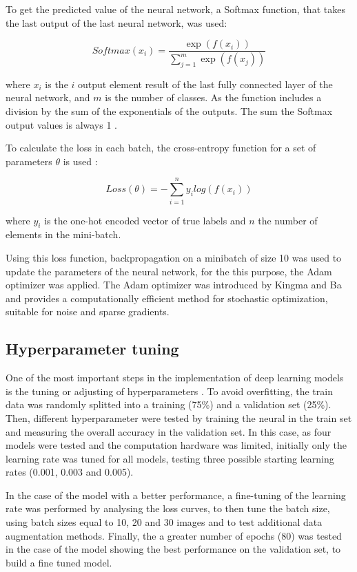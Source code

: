 \documentclass[10pt,onecolumn,titlepage,letterpaper]{article}
\begin{document}
To get the predicted value of the neural network, a Softmax function, that takes the last output of the last neural network, was used:

\begin{equation}
	{Softmax}(x_{i}) = \frac{\exp(f(x_i))}{\sum_{j=1}^{m} \exp(f(x_j))}
\end{equation}

where $x_i$ is the $i$ output element result of the last fully connected layer of the neural network, and $m$ is the number of classes. As the function includes a division by the sum of the exponentials of the outputs. The sum the Softmax output values is always 1 \cite{Skansi2018}.

To calculate the loss in each batch, the cross-entropy function for a set of parameters $\theta$ is used \cite{Skansi2018}:

\begin{equation}
	{Loss}(\theta) = - \sum_{i=1}^{n} y_i log(f(x_i))
\end{equation}

where $y_i$ is the one-hot encoded vector of true labels and $n$ the number of elements in the mini-batch. 

Using this loss function, backpropagation on a minibatch of size 10 was used to update the parameters of the neural network, for the this purpose, the Adam optimizer was applied. The Adam optimizer was introduced by Kingma and Ba \cite{Kingma2015} and provides a computationally efficient method for stochastic optimization, suitable for noise and sparse gradients.

\subsection{Hyperparameter tuning}

One of the most important steps in the implementation of deep learning models is the tuning or adjusting of hyperparameters \cite{Skansi2018}. To avoid overfitting, the train data was randomly splitted into a training (75\%) and a validation set (25\%). Then, different hyperparameter were tested by training the neural in the train set and measuring the overall accuracy in the validation set. In this case, as four models were tested and the computation hardware was limited, initially only the learning rate was tuned for all models, testing three possible starting learning rates (0.001, 0.003 and 0.005). 

In the case of the model with a better performance, a fine-tuning of the learning rate was performed by analysing the loss curves, to then tune the batch size, using batch sizes equal to 10, 20 and 30 images and to test additional data augmentation methods. Finally, the a greater number of epochs (80) was tested in the case of the model showing the best performance on the validation set, to build a fine tuned model.
\end{document}
